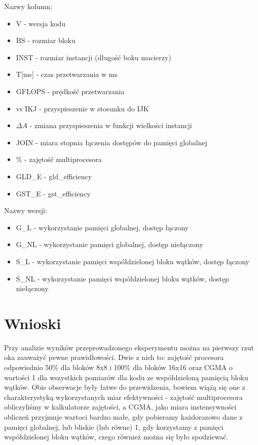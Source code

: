 \documentclass[10pt,a4paper]{article}
\begin{document}
Nazwy kolumn:
\begin{itemize}
	\item V - wersja kodu 
	\item BS - rozmiar bloku 
	\item INST - rozmiar instancji (długość boku macierzy)
	\item T[ms] - czas przetwarzania w ms 
	\item GFLOPS - prędkość przetwarzania
	\item vs IKJ - przyspieszenie w stosunku do IJK 
	\item $\Delta A$ - zmiana przyspieszenia w funkcji wielkości instancji
	\item JOIN - miara stopnia łączenia dostępów do pamięci globalnej
	\item \% - zajętość multiprocesora
	\item GLD\_E - gld\_efficiency 
	\item GST\_E - gst\_efficiency
\end{itemize}

Nazwy wersji:
\begin{itemize}
	\item G\_L - wykorzystanie pamięci globalnej, dostęp łączony
	\item G\_NL - wykorzystanie pamięci globalnej, dostęp niełączony
	\item S\_L - wykorzystanie pamięci współdzielonej bloku wątków, dostęp łączony
	\item S\_NL - wykorzystanie pamięci współdzielonej bloku wątków, dostęp niełączony
\end{itemize}

\section{Wnioski}
Przy analizie wyników przeprowadzonego eksperymentu można na pierwszy rzut oka zauważyć
pewne prawidłowości. Dwie z nich to: zajętość procesora odpowiednio 50\% dla bloków 8x8 i 
100\% dla bloków 16x16 oraz CGMA o wartości 1 dla wszystkich pomiarów dla kodu ze współdzieloną
pamięcią bloku wątków. Obie obserwacje były łatwe do przewidzenia, bowiem wiążą się one z charakterystyką
wykorzystanych miar efektywności - zajętość multiprocesora obliczyliśmy w kalkulatorze zajętości,
a CGMA, jako miara instensywności obliczeń przyjmuje wartoci bardzo małe, gdy pobieramy 
każdorazowo dane z pamięci globalnej, lub bliskie (lub równe) 1, gdy korzystamy z pamięci
współdzielonej bloku wątków, czego również można się było spodziewać. \\
\end{document}
